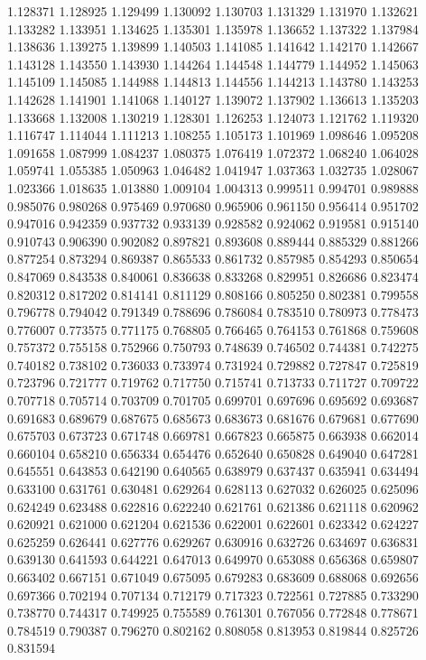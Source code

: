 1.128371
1.128925
1.129499
1.130092
1.130703
1.131329
1.131970
1.132621
1.133282
1.133951
1.134625
1.135301
1.135978
1.136652
1.137322
1.137984
1.138636
1.139275
1.139899
1.140503
1.141085
1.141642
1.142170
1.142667
1.143128
1.143550
1.143930
1.144264
1.144548
1.144779
1.144952
1.145063
1.145109
1.145085
1.144988
1.144813
1.144556
1.144213
1.143780
1.143253
1.142628
1.141901
1.141068
1.140127
1.139072
1.137902
1.136613
1.135203
1.133668
1.132008
1.130219
1.128301
1.126253
1.124073
1.121762
1.119320
1.116747
1.114044
1.111213
1.108255
1.105173
1.101969
1.098646
1.095208
1.091658
1.087999
1.084237
1.080375
1.076419
1.072372
1.068240
1.064028
1.059741
1.055385
1.050963
1.046482
1.041947
1.037363
1.032735
1.028067
1.023366
1.018635
1.013880
1.009104
1.004313
0.999511
0.994701
0.989888
0.985076
0.980268
0.975469
0.970680
0.965906
0.961150
0.956414
0.951702
0.947016
0.942359
0.937732
0.933139
0.928582
0.924062
0.919581
0.915140
0.910743
0.906390
0.902082
0.897821
0.893608
0.889444
0.885329
0.881266
0.877254
0.873294
0.869387
0.865533
0.861732
0.857985
0.854293
0.850654
0.847069
0.843538
0.840061
0.836638
0.833268
0.829951
0.826686
0.823474
0.820312
0.817202
0.814141
0.811129
0.808166
0.805250
0.802381
0.799558
0.796778
0.794042
0.791349
0.788696
0.786084
0.783510
0.780973
0.778473
0.776007
0.773575
0.771175
0.768805
0.766465
0.764153
0.761868
0.759608
0.757372
0.755158
0.752966
0.750793
0.748639
0.746502
0.744381
0.742275
0.740182
0.738102
0.736033
0.733974
0.731924
0.729882
0.727847
0.725819
0.723796
0.721777
0.719762
0.717750
0.715741
0.713733
0.711727
0.709722
0.707718
0.705714
0.703709
0.701705
0.699701
0.697696
0.695692
0.693687
0.691683
0.689679
0.687675
0.685673
0.683673
0.681676
0.679681
0.677690
0.675703
0.673723
0.671748
0.669781
0.667823
0.665875
0.663938
0.662014
0.660104
0.658210
0.656334
0.654476
0.652640
0.650828
0.649040
0.647281
0.645551
0.643853
0.642190
0.640565
0.638979
0.637437
0.635941
0.634494
0.633100
0.631761
0.630481
0.629264
0.628113
0.627032
0.626025
0.625096
0.624249
0.623488
0.622816
0.622240
0.621761
0.621386
0.621118
0.620962
0.620921
0.621000
0.621204
0.621536
0.622001
0.622601
0.623342
0.624227
0.625259
0.626441
0.627776
0.629267
0.630916
0.632726
0.634697
0.636831
0.639130
0.641593
0.644221
0.647013
0.649970
0.653088
0.656368
0.659807
0.663402
0.667151
0.671049
0.675095
0.679283
0.683609
0.688068
0.692656
0.697366
0.702194
0.707134
0.712179
0.717323
0.722561
0.727885
0.733290
0.738770
0.744317
0.749925
0.755589
0.761301
0.767056
0.772848
0.778671
0.784519
0.790387
0.796270
0.802162
0.808058
0.813953
0.819844
0.825726
0.831594
